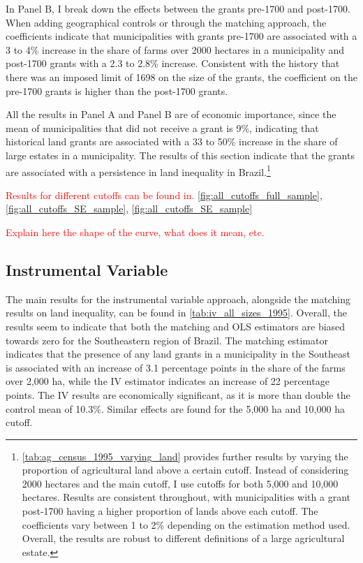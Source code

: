 \documentclass[11pt]{article}
\newcommand{\red}[1]{\textcolor{red}{#1}}
\begin{document}
In Panel B, I break down the effects between the grants pre-1700 and post-1700.
When adding geographical controls or through the matching approach, the coefficients indicate that municipalities with grants pre-1700 are associated with a 3 to 4\% increase in the share of farms over 2000 hectares in a municipality and post-1700 grants with a 2.3 to 2.8\% increase. 
Consistent with the history that there was an imposed limit of 1698 on the size of the grants, the coefficient on the pre-1700 grants is higher than the post-1700 grants.

All the results in Panel A and Panel B are of economic importance, since the mean of municipalities that did not receive a grant is 9\%, indicating that historical land grants are associated with a 33 to 50\% increase in the share of large estates in a municipality.
The results of this section indicate that the grants are associated with a persistence in land inequality in Brazil.\footnote{\autoref{tab:ag_census_1995_varying_land} provides further results by varying the proportion of agricultural land above a certain cutoff. 
Instead of considering 2000 hectares and the main cutoff, I use cutoffs for both 5,000 and 10,000 hectares. 
Results are consistent throughout, with municipalities with a grant post-1700 having a higher proportion of lands above each cutoff. 
The coefficients vary between 1 to 2\% depending on the estimation method used. 
Overall, the results are robust to different definitions of a large agricultural estate.}

\red{Results for different cutoffs can be found in.}
\autoref{fig:all_cutoffs_full_sample},
\autoref{fig:all_cutoffs_SE_sample},
\autoref{fig:all_cutoffs_SE_sample}

\red{Explain here the shape of the curve, what does it mean, etc.}

\subsection{Instrumental Variable}


The main results for the instrumental variable approach, alongside the matching results on land inequality, can be found in \autoref{tab:iv_all_sizes_1995}.
Overall, the results seem to indicate that both the matching and OLS estimators are biased towards zero for the Southeastern region of Brazil.
The matching estimator indicates that the presence of any land grants in a municipality in the Southeast is associated with an increase of 3.1 percentage points in the share of the farms over 2,000 ha, while the IV estimator indicates an increase of 22 percentage points. 
The IV results are economically significant, as it is more than double the control mean of 10.3\%.
Similar effects are found for the 5,000 ha and 10,000 ha cutoff. 
\end{document}
